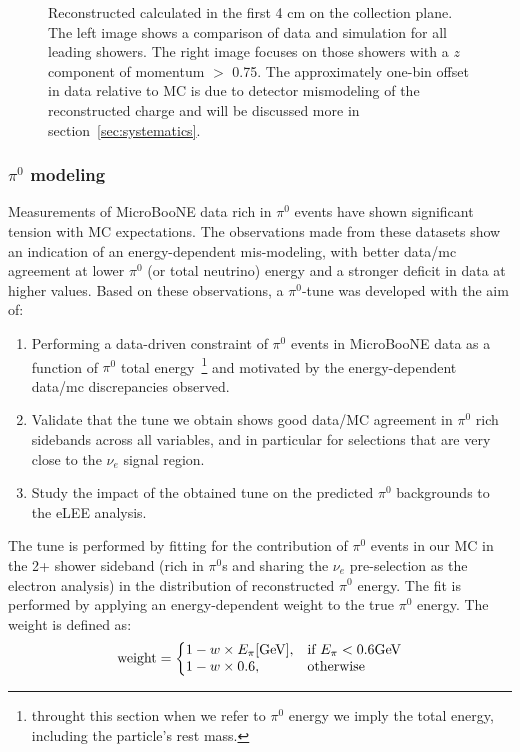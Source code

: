 \begin{figure}[H]
\begin{center}
\caption{Reconstructed \dedx calculated in the first 4 cm on the collection plane. The left image shows a comparison of data and simulation for all leading showers. The right image focuses on those showers with a $z$ component of momentum $>$ 0.75. The approximately one-bin offset in data relative to MC is due to detector mismodeling of the reconstructed charge and will be discussed more in section~\ref{sec:systematics}.}
\label{fig:pi0:dedxbest}
\end{center}
\end{figure}

\subsubsection{$\pi^0$ modeling}
\label{sec:pi0tune}
\par Measurements of MicroBooNE data rich in $\pi^0$ events have shown significant tension with MC expectations. The observations made from these datasets show an indication of an energy-dependent mis-modeling, with better data/mc agreement at lower $\pi^0$ (or total neutrino) energy and a stronger deficit in data at higher values. Based on these observations, a $\pi^0$-tune was developed with the aim of:
\begin{enumerate}
    \item Performing a data-driven constraint of $\pi^0$ events in MicroBooNE data as a function of $\pi^0$ total energy~\footnote{throught this section when we refer to $\pi^0$ energy we imply the total energy, including the particle's rest mass.} and motivated by the energy-dependent data/mc discrepancies observed.
    \item Validate that the tune we obtain shows good data/MC agreement in $\pi^0$ rich sidebands across all variables, and in particular for selections that are very close to the $\nu_e$ signal region.
    \item Study the impact of the obtained tune on the predicted $\pi^0$ backgrounds to the eLEE analysis.
\end{enumerate}
The tune is performed by fitting for the contribution of $\pi^0$ events in our MC in the 2+ shower sideband (rich in $\pi^0$s and sharing the $\nu_e$ pre-selection as the electron analysis) in the distribution of reconstructed $\pi^0$ energy. The fit is performed by applying an energy-dependent weight to the true $\pi^0$ energy. The weight is defined as:
\begin{equation}
  \text{weight}=\left\{
  \begin{array}{@{}ll@{}}
    1 - w \times E_{\pi} [\text{GeV}], & \text{if}\ E_{\pi} < 0.6 \text{GeV} \\
    1 - w \times 0.6, & \text{otherwise}
  \end{array}\right.
\end{equation} 
